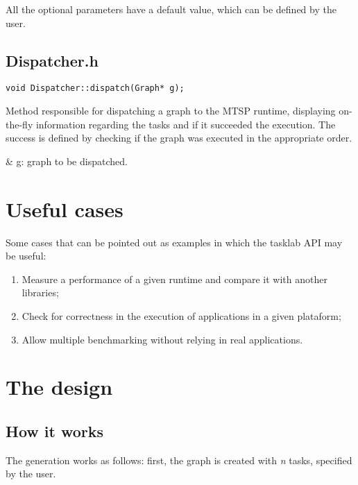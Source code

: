 \documentclass[a4paper,10pt]{article}
\begin{document}
        All the optional parameters have a default value, which can be defined by the user.

    \vspace{3mm} 

    \subsection{Dispatcher.h}
        \begin{lstlisting} 
void Dispatcher::dispatch(Graph* g);
        \end{lstlisting}

        Method responsible for dispatching a graph to the MTSP runtime, displaying on-the-fly information regarding the tasks and if it succeeded the execution. The success is defined by checking if the graph was executed in the appropriate order.
        \vspace{1mm} 

        \begin{easylist}
            & g: graph to be dispatched.
        \end{easylist}

        \vspace{5mm} 
\section{Useful cases}
    Some cases that can be pointed out as examples in which the tasklab API may be useful:
    \begin{enumerate}
        \item Measure a performance of a given runtime and compare it with another libraries;
        \item Check for correctness in the execution of applications in a given plataform;
        \item Allow multiple benchmarking without relying in real applications.
    \end{enumerate}

\section{The design}
    \subsection{How it works}
       The generation works as follows: first, the graph is created with \textit{n} tasks, specified by the user.
\end{document}
